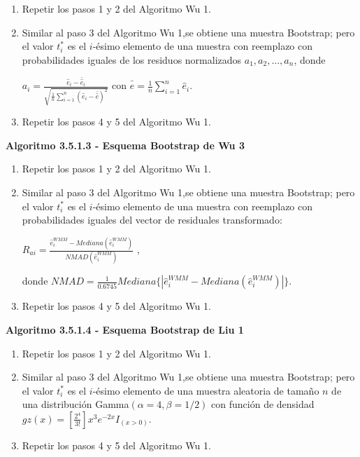 \begin{enumerate}
	\item Repetir los pasos 1 y 2 del Algoritmo Wu 1.
	
	\item  Similar al paso 3 del Algoritmo Wu 1,se obtiene una muestra Bootstrap;
	pero el valor $t^{*}_{i}$ es el $i$-ésimo elemento de una muestra con reemplazo con probabilidades iguales de los residuos normalizados $a_{1},a_{2}, \dots,a_{n}$, donde
	
	\begin{center}
		{\Large $a_{i} = \frac{\hat{e}_{i}-\bar{\hat{ e}}_{i}}{ \sqrt{ \frac{1}{n} \sum_{i=1}^{n} (\hat{e}_{i}-\bar{\hat{e}})^{2} } }$} con {\large $ \bar{\hat{e}}= \frac{1}{n} \sum_{i=1}^{n} \hat{e}_{i} $}.
	\end{center}
	
	\item Repetir los pasos 4 y 5 del Algoritmo Wu 1.
\end{enumerate}



\textbf{Algoritmo 3.5.1.3 - Esquema Bootstrap de Wu 3}

\begin{enumerate}
	\item Repetir los pasos 1 y 2 del Algoritmo Wu 1.
	
	\item  Similar al paso 3 del Algoritmo Wu 1,se obtiene una muestra Bootstrap;
	pero el valor $t^{*}_{i}$ es el $i$-ésimo elemento de una muestra con reemplazo con probabilidades iguales del vector de residuales transformado:
	
	\begin{center}
		{\large $R_{ai} = \frac{\hat{e}^{WMM}_{i} - Mediana(\hat{e}^{WMM}_{i})}{ NMAD(\hat{e}^{WMM}_{i})  }$} ,
	\end{center}
	donde $NMAD = \frac{1}{0.6745} Mediana\{ | \hat{e}^{WMM}_{i} - Mediana(\hat{e}^{WMM}_{i}) | \}$.
	
	\item Repetir los pasos 4 y 5 del Algoritmo Wu 1.
\end{enumerate}


\textbf{Algoritmo 3.5.1.4 - Esquema Bootstrap de Liu 1}

\begin{enumerate}
	\item Repetir los pasos 1 y 2 del Algoritmo Wu 1.
	
	\item  Similar al paso 3 del Algoritmo Wu 1,se obtiene una muestra Bootstrap;
	pero el valor $t^{*}_{i}$ es el $i$-ésimo elemento de una muestra aleatoria de tamaño $n$ de una distribución Gamma$(\alpha = 4,\beta = 1/2)$ con función de densidad $ gz(x) = [\frac{2^{4}}{3!}]x^{3}e^{-2x}I_{(x>0)}$.

	
	\item Repetir los pasos 4 y 5 del Algoritmo Wu 1.
\end{enumerate}




